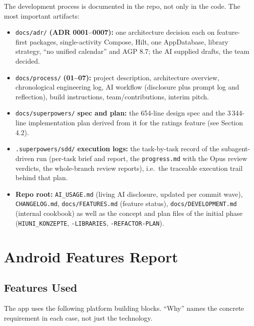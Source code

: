 \documentclass{msereport}
\begin{document}
The development process is documented in the repo, not only in the code. The
most important artifacts:

\begin{itemize}
  \item \texttt{docs/adr/} \textbf{(ADR 0001--0007):} one architecture
        decision each on feature-first packages, single-activity Compose, Hilt,
        one AppDatabase, library strategy, ``no unified calendar'' and
        AGP 8.7; the AI supplied drafts, the team decided.
  \item \texttt{docs/process/} \textbf{(01--07):} project description,
        architecture overview, chronological engineering log, AI workflow
        (disclosure plus prompt log and reflection), build instructions,
        team/contributions, interim pitch.
  \item \texttt{docs/superpowers/} \textbf{spec and plan:} the 654-line design spec
        and the 3\,344-line implementation plan derived from it for the
        ratings feature (see Section 4.2).
  \item \texttt{.superpowers/sdd/} \textbf{execution logs:} the task-by-task
        record of the subagent-driven run (per-task brief and report, the
        \texttt{progress.md} with the Opus review verdicts, the whole-branch
        review reports), i.e.\ the traceable execution trail behind that plan.
  \item \textbf{Repo root:} \texttt{AI\_USAGE.md} (living AI disclosure, updated
        per commit wave), \texttt{CHANGELOG.md},
        \texttt{docs/FEATURES.md} (feature status), \texttt{docs/DEVELOPMENT.md}
        (internal cookbook) as well as the concept and plan files of the initial
        phase (\texttt{HIUNI\_KONZEPTE}, \texttt{-LIBRARIES}, \texttt{-REFACTOR-PLAN}).
\end{itemize}

\msegap

\section{Android Features Report}

\subsection{Features Used}

The app uses the following platform building blocks. ``Why'' names the concrete
requirement in each case, not just the technology.
\par\vspace{6pt}
\end{document}
